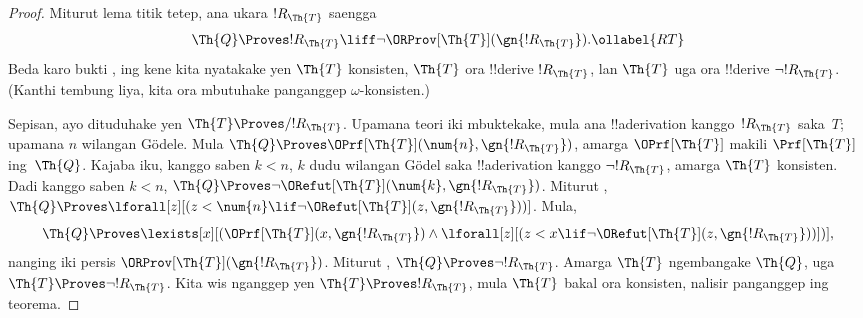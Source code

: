 \documentclass[../../../include/open-logic-section]{subfiles}
\begin{document}
\begin{proof}
Miturut lema titik tetep, ana ukara $!R_\Th{T}$ saengga
\begin{equation}
  \Th{Q} \Proves !R_\Th{T} \liff \lnot \ORProv[\Th{T}](\gn{!R_\Th{T}}).
  \ollabel{RT}
\end{equation}
Beda karo bukti , ing kene kita
nyatakake yen $\Th{T}$ konsisten, $\Th{T}$ ora !!{derive}
$!R_\Th{T}$, lan $\Th{T}$ uga ora !!{derive} $\lnot !R_\Th{T}$.
(Kanthi tembung liya, kita ora mbutuhake panganggep
$\omega$-konsisten.)

Sepisan, ayo dituduhake yen $\Th{T} \Proves/ !R_{\Th{T}}$.
Upamana teori iki mbuktekake, mula ana !!a{derivation}
kanggo~$!R_{\Th{T}}$ saka~$T$; upamana $n$ wilangan G\"odele. Mula
$\Th{Q} \Proves \OPrf[\Th{T}](\num{n}, \gn{!R_{\Th{T}}})$, amarga
$\OPrf[\Th{T}]$ makili $\Prf[\Th{T}]$ ing~$\Th{Q}$.
Kajaba iku, kanggo saben $k < n$, $k$ dudu wilangan G\"odel saka
!!a{derivation} kanggo $\lnot !R_{\Th{T}}$, amarga $\Th{T}$
konsisten. Dadi kanggo saben $k < n$, $\Th{Q} \Proves \lnot
\ORefut[\Th{T}](\num{k}, \gn{!R_{\Th{T}}})$. Miturut
,
$\Th{Q} \Proves \lforall[z][(z < \num{n} \lif \lnot \ORefut[\Th{T}](z,
  \gn{!R_{\Th{T}}}))]$. Mula,
\[
\Th{Q} \Proves \lexists[x][(\OPrf[\Th{T}](x,\gn{!R_{\Th{T}}}) \land \lforall[z][(z
    < x \lif \lnot \ORefut[\Th{T}](z,\gn{!R_{\Th{T}}}))])],
\]
nanging iki persis $\ORProv[\Th{T}](\gn{!R_{\Th{T}}})$. Miturut
, $\Th{Q} \Proves \lnot !R_{\Th{T}}$. Amarga $\Th{T}$
ngembangake $\Th{Q}$, uga $\Th{T} \Proves \lnot !R_{\Th{T}}$.
Kita wis nganggep yen $\Th{T} \Proves !R_{\Th{T}}$, mula $\Th{T}$
bakal ora konsisten, nalisir panganggep ing teorema.


\end{proof}
\end{document}
